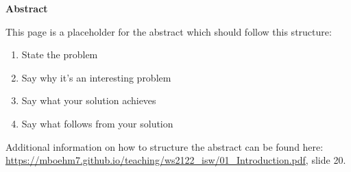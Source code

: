 \thispagestyle{empty}
\vspace*{1.0cm}

\begin{center}
    \textbf{Abstract} \label{abstract}
\end{center}

\vspace*{0.5cm}

\noindent
This page is a placeholder for the abstract which should follow this structure:

\begin{enumerate}
    \item State the problem
    \item Say why it's an interesting problem
    \item Say what your solution achieves
    \item Say what follows from your solution
\end{enumerate}

Additional information on how to structure the abstract can be found here: \url{https://mboehm7.github.io/teaching/ws2122_isw/01_Introduction.pdf}, slide 20.